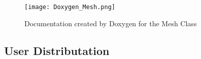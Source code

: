 \begin{figure}
\texttt{[image: Doxygen\_Mesh.png]}
\centering
\caption{Documentation created by Doxygen for the Mesh Class}
\label{fig:Doxygen_Mesh}
\end{figure}


\subsection{User Distributation}
% 
